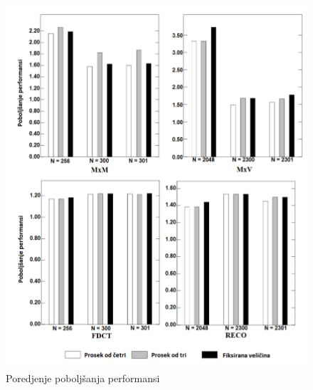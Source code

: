 \documentclass[a4paper]{article}
\begin{document}
\begin{figure}[h]
\includegraphics[scale=0.5]{performanse3}
\caption{Poredjenje poboljšanja performansi}
\label{fig:slika4}
\end{figure}
\end{document}
